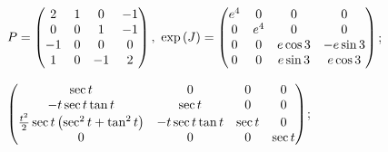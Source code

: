 \begin{enumsolsfull}
		\item \( P = \begin{pmatrix} 2 & 1 & 0 & -1 \\ 0 & 0 & 1 & -1 \\ -1 & 0 & 0 & 0 \\ 1 & 0 & -1 & 2 \end{pmatrix}, ~ \exp \left( J \right) = \begin{pmatrix} e^{4} & 0 & 0 & 0 \\ 0 & e^{4} & 0 & 0 \\ 0 & 0 & e \cos{3} & -e \sin{3} \\ 0 & 0 & e \sin{3} & e \cos{3} \end{pmatrix} \); %
		\item \( \begin{pmatrix} \sec{t} & 0 & 0 & 0 \\ -t \sec{t} \tan{t} & \sec{t} & 0 & 0 \\ \frac{t^2}{2} \sec{t} \left( \sec^2{t} + \tan^2{t} \right) & -t \sec{t} \tan{t} & \sec{t} & 0 \\ 0 & 0 & 0 & \sec{t} \end{pmatrix} \); %

\end{enumsolsfull}
